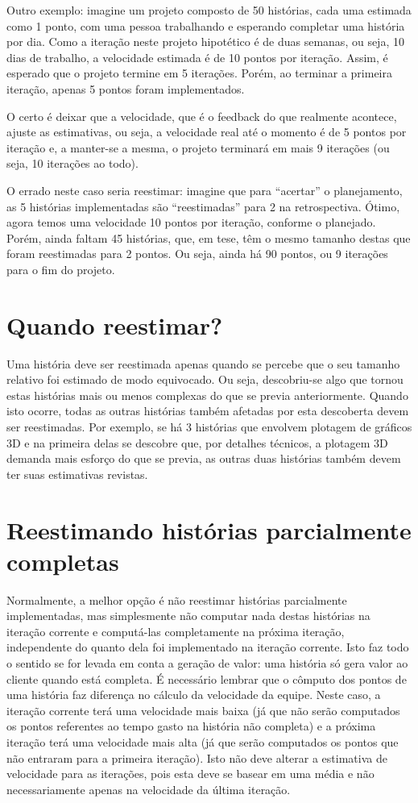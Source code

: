\documentclass[a4paper,abntfigtabnum,noindentfirst]{abnt}
\begin{document}
Outro exemplo: imagine um projeto composto de 50 histórias, cada uma estimada como 1 ponto, com uma pessoa trabalhando e esperando completar uma história por dia. Como a iteração neste projeto hipotético é de duas semanas, ou seja, 10 dias de trabalho, a velocidade estimada é de 10 pontos por iteração. Assim, é esperado que o projeto termine em 5 iterações. Porém, ao terminar a primeira iteração, apenas 5 pontos foram implementados.

O certo é deixar que a velocidade, que é o feedback do que realmente acontece, ajuste as estimativas, ou seja, a velocidade real até o momento é de 5 pontos por iteração e, a manter-se a mesma, o projeto terminará em mais 9 iterações (ou seja, 10 iterações ao todo).

O errado neste caso seria reestimar: imagine que para ``acertar'' o planejamento, as 5 histórias implementadas são ``reestimadas'' para 2 na retrospectiva. Ótimo, agora temos uma velocidade 10 pontos por iteração, conforme o planejado. Porém, ainda faltam 45 histórias, que, em tese, têm o mesmo tamanho destas que foram reestimadas para 2 pontos. Ou seja, ainda há 90 pontos, ou 9 iterações para o fim do projeto.


\section{Quando reestimar?}

Uma história deve ser reestimada apenas quando se percebe que o seu tamanho relativo foi estimado de modo equivocado. Ou seja, descobriu-se algo que tornou estas histórias mais ou menos complexas do que se previa anteriormente. Quando isto ocorre, todas as outras histórias também afetadas por esta descoberta devem ser reestimadas. Por exemplo, se há 3 histórias que envolvem plotagem de gráficos 3D e na primeira delas se descobre que, por detalhes técnicos, a plotagem 3D demanda mais esforço do que se previa, as outras duas histórias também devem ter suas estimativas revistas.


\section{Reestimando histórias parcialmente completas}

Normalmente, a melhor opção é não reestimar histórias parcialmente implementadas, mas simplesmente não computar nada destas histórias na iteração corrente e computá-las completamente na próxima iteração, independente do quanto dela foi implementado na iteração corrente. Isto faz todo o sentido se for levada em conta a geração de valor: uma história só gera valor ao cliente quando está completa. É necessário lembrar que o cômputo dos pontos de uma história faz diferença no cálculo da velocidade da equipe. Neste caso, a iteração corrente terá uma velocidade mais baixa (já que não serão computados os pontos referentes ao tempo gasto na história não completa) e a próxima iteração terá uma velocidade mais alta (já que serão computados os pontos que não entraram para a primeira iteração). Isto não deve alterar a estimativa de velocidade para as iterações, pois esta deve se basear em uma média e não necessariamente apenas na velocidade da última iteração.
\end{document}
